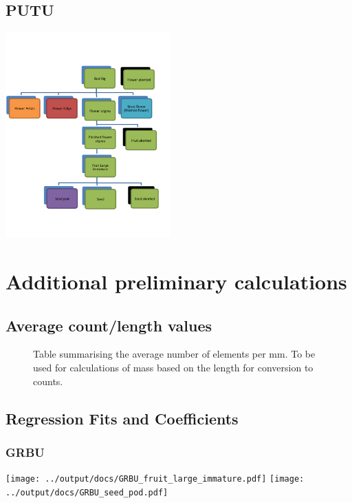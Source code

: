 \documentclass[10pt]{book} %
\begin{document}
\clearpage
\newpage
\section{PUTU}
\begin{multicols}{2}
\includegraphics[width=2.5in]{PUTU.png}
\vfill
\columnbreak

\end{multicols}




\chapter{Additional preliminary calculations}

\section{Average count/length values}


\begin{figure}[h!]
\begin{center}

\end{center}
\caption{Table summarising the average number of elements per mm. To be used for calculations of mass based on the length for conversion to counts.}
\end{figure}


\section{Regression Fits and Coefficients}
\subsection*{GRBU}
\begin{center}
\texttt{[image: ../output/docs/GRBU\_fruit\_large\_immature.pdf]}
\texttt{[image: ../output/docs/GRBU\_seed\_pod.pdf]}
\end{center}
\end{document}
